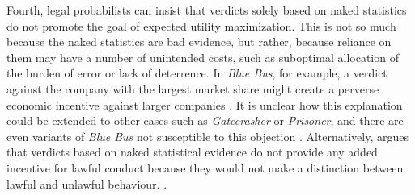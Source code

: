 \documentclass{article}
\begin{document}
 Fourth, legal probabilists can insist that verdicts solely based on naked statistics do not promote the goal of expected utility maximization. This is not so much because the naked statistics are bad evidence, but rather, because reliance on them may have a number of unintended costs, such as suboptimal allocation of the burden of error or lack of deterrence. 
 In \textit{Blue Bus}, for example, a verdict against the company with the largest market share might create a perverse economic incentive against larger companies \citep{Posner1973}. It is unclear how this explanation could be extended to other cases such as \textit{Gatecrasher} or \textit{Prisoner}, and there are even variants of \emph{Blue Bus} not susceptible to this objection \citep{wells1992naked}. 
 Alternatively, \cite{dahlmanNakedStat2020} argues
 that verdicts based on naked statistical evidence do not provide any added incentive for lawful conduct because they would not make a distinction between lawful and unlawful behaviour.  \citep[On deterrence and naked statistics, see also][]{Enoch2012Statistical, enoch2015sense}. 
\end{document}
